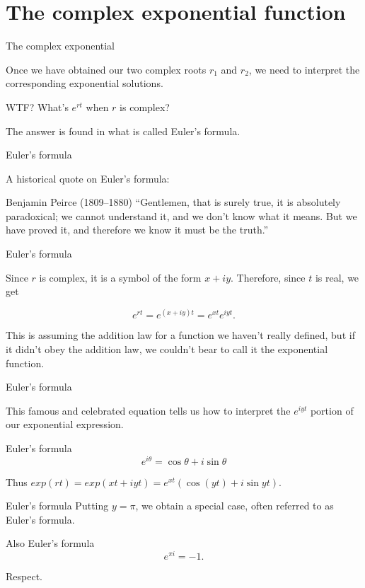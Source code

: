 \documentclass{beamer}
\begin{document}
\section{The complex exponential function}

\begin{frame}{The complex exponential}

  Once we have obtained our two complex roots $r_1$ and $r_2$, we need to interpret the corresponding exponential solutions. 
  \pause
  \begin{block}{WTF?}
    What's $e^{rt}$ when $r$ is complex?
  \end{block}
  
  The answer is found in what is called Euler's formula.
\end{frame}

\begin{frame}{Euler's formula}
  
  A historical quote on Euler's formula:

  \begin{block}{Benjamin Peirce (1809--1880)}
    ``Gentlemen, that is surely true,
it is absolutely paradoxical;
we cannot understand it,
and we don't know what it means.
But we have proved it,
and therefore we know it must be the truth.''
  \end{block}

\end{frame}

\begin{frame}{Euler's formula}
  
  Since $r$ is complex, it is a symbol of the form $x + iy$. Therefore, since $t$ is real, we get

  \[
    e^{rt} = e^{(x+iy)t} = e^{xt} e^{iyt}.
  \]

  This is assuming the addition law for a function we haven't really defined, but if it didn't obey the addition law, we couldn't bear to call it the exponential function.
\end{frame}

\begin{frame}{Euler's formula}
  
  This famous and celebrated equation tells us how to interpret the $e^{iyt}$ portion of our exponential expression.

  \begin{block}{Euler's formula}
    \[e^{i \theta} = \cos{\theta} + i \sin{\theta}\]
  \end{block}
 
  Thus $exp(rt) = exp(xt + iyt) = e^{xt}(\cos(yt) + i \sin{yt})$.

\end{frame}

\begin{frame}{Euler's formula}
  Putting $y = \pi$, we obtain a special case, often referred to as Euler's formula.

  \begin{block}{Also Euler's formula}
    \[ e^{\pi i} = -1. \]
  \end{block}
  
  Respect.

\end{frame}
\end{document}
